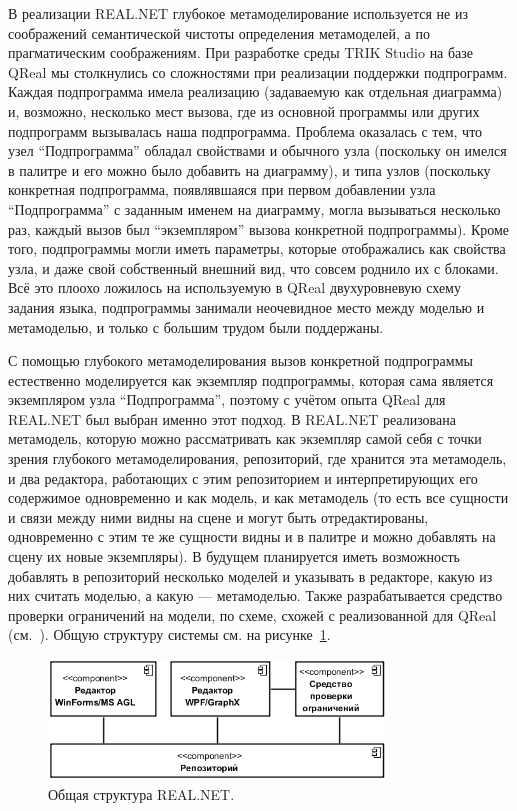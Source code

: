 \documentclass{spisok-article}
\begin{document}
В реализации REAL.NET глубокое метамоделирование используется не из соображений семантической чистоты определения метамоделей, а по прагматическим соображениям. При разработке среды TRIK Studio на базе QReal мы столкнулись со сложностями при реализации поддержки подпрограмм. Каждая подпрограмма имела реализацию (задаваемую как отдельная диаграмма) и, возможно, несколько мест вызова, где из основной программы или других подпрограмм вызывалась наша подпрограмма. Проблема оказалась с тем, что узел ``Подпрограмма'' обладал свойствами и обычного узла (поскольку он имелся в палитре и его можно было добавить на диаграмму), и типа узлов (поскольку конкретная подпрограмма, появлявшаяся при первом добавлении узла ``Подпрограмма'' с заданным именем на диаграмму, могла вызываться несколько раз, каждый вызов был ``экземпляром'' вызова конкретной подпрограммы). Кроме того, подпрограммы могли иметь параметры, которые отображались как свойства узла, и даже свой собственный внешний вид, что совсем роднило их с блоками. Всё это плоохо ложилось на используемую в QReal двухуровневую схему задания языка, подпрограммы занимали неочевидное место между моделью и метамоделью, и только с большим трудом были поддержаны.

С помощью глубокого метамоделирования вызов конкретной подпрограммы естественно моделируется как экземпляр подпрограммы, которая сама является экземпляром узла ``Подпрограмма'', поэтому с учётом опыта QReal для REAL.NET был выбран именно этот подход. В REAL.NET реализована метамодель, которую можно рассматривать как экземпляр самой себя с точки зрения глубокого метамоделирования, репозиторий, где хранится эта метамодель, и два редактора, работающих с этим репозиторием и интерпретирующих его содержимое одновременно и как модель, и как метамодель (то есть все сущности и связи между ними видны на сцене и могут быть отредактированы, одновременно с этим те же сущности видны и в палитре и можно добавлять на сцену их новые экземпляры). В будущем планируется иметь возможность добавлять в репозиторий несколько моделей и указывать в редакторе, какую из них считать моделью, а какую --- метамоделью. Также разрабатывается средство проверки ограничений на модели, по схеме, схожей с реализованной для QReal (см.~\cite{deripaska2013constraints}). Общую структуру системы см. на рисунке~\ref{image:architecture}.

\begin{figure}[ht]
	\centering
	\includegraphics[width=0.8\textwidth]{architecture.png}
	\caption{Общая структура REAL.NET.}
	\label{image:architecture}
\end{figure}
\end{document}

